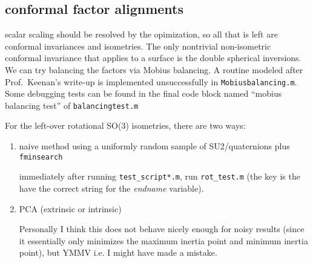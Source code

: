 \documentclass[11pt]{article}
\theoremstyle{definition}
\begin{document}
\subsection{conformal factor alignments}
scalar scaling should be resolved by the opimization, so all that is left are conformal invariances and isometries. The only nontrivial non-isometric conformal invariance that applies to a surface is the double spherical inversions. We can try balancing the factors via M\:obius balancing. A routine modeled after Prof.~Keenan's write-up is implemented unsuccessfully in \verb|Mobiusbalancing.m|. Some debugging tests can be found in the final code block named ``mobius balancing test'' of \verb|balancingtest.m|

For the left-over rotational SO(3) isometries, there are two ways:
\begin{enumerate}
	\item naive method using a uniformly random sample of SU2/quaternions plus \verb|fminsearch|
	
	immediately after running \verb|test_script*.m|, run \verb|rot_test.m| (the key is the have the correct string for the \textit{endname} variable).
	\item PCA (extrinsic or intrinsic)
	
	Personally I think this does not behave nicely enough for noisy results (since it essentially only minimizes the maximum inertia point and minimum inertia point), but YMMV i.e. I might have made a mistake.
\end{enumerate}
\end{document}
